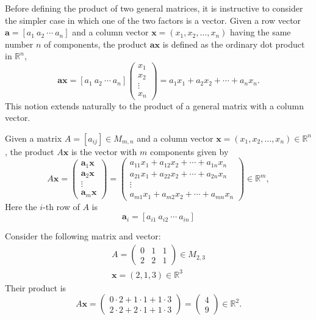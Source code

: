 Before defining the product of two general matrices, it is instructive to consider the simpler case in which one of the two factors is a vector. Given a row vector $\mathbf{a} = [a_1 \ a_2 \ \cdots \ a_n]$ and a column vector $\mathbf{x} = (x_1, x_2, \dots, x_n)$ having the same number $n$ of components, the product $\mathbf{a}\mathbf{x}$ is defined as the ordinary dot product in $\mathbb{R}^n$,
\[
\mathbf{a}\mathbf{x} = [a_1 \ a_2 \ \cdots \ a_n]
\begin{pmatrix} x_1 \\ x_2 \\ \vdots \\ x_n \end{pmatrix}
= a_1 x_1 + a_2 x_2 + \cdots + a_n x_n.
\]
This notion extends naturally to the product of a general matrix with a column vector.

\begin{definition}
Given a matrix $A = [a_{ij}] \in M_{m,n}$ and a column vector $\mathbf{x} = (x_1, x_2, \dots, x_n) \in \mathbb{R}^n$, the product $A\mathbf{x}$ is the vector with $m$ components given by
\[
A\mathbf{x} =
\begin{pmatrix} \mathbf{a}_1 \mathbf{x} \\ \mathbf{a}_2 \mathbf{x} \\ \vdots \\ \mathbf{a}_m \mathbf{x} \end{pmatrix}
=
\begin{pmatrix}
a_{11} x_1 + a_{12} x_2 + \cdots + a_{1n} x_n \\
a_{21} x_1 + a_{22} x_2 + \cdots + a_{2n} x_n \\
\vdots \\
a_{m1} x_1 + a_{m2} x_2 + \cdots + a_{mn} x_n
\end{pmatrix} \in \mathbb{R}^m,
\]
Here the $i$-th row of $A$ is
\[
\mathbf{a}_i = [a_{i1} \ a_{i2} \ \cdots \ a_{in}]
\]

\end{definition}

\begin{example}
Consider the following matrix and vector:
\[
\begin{gathered}
A = \begin{pmatrix} 0 & 1 & 1 \\ 2 & 2 & 1 \end{pmatrix} \in M_{2,3} \\
\mathbf{x} = (2,1,3) \in \mathbb{R}^3
\end{gathered}
\]
Their product is
\[
A\mathbf{x} = \begin{pmatrix} 0\cdot 2 + 1 \cdot 1 + 1 \cdot 3 \\ 2 \cdot 2 + 2 \cdot 1 + 1 \cdot 3 \end{pmatrix} = \begin{pmatrix} 4 \\ 9 \end{pmatrix} \in \mathbb{R}^2.
\]

\end{example}

